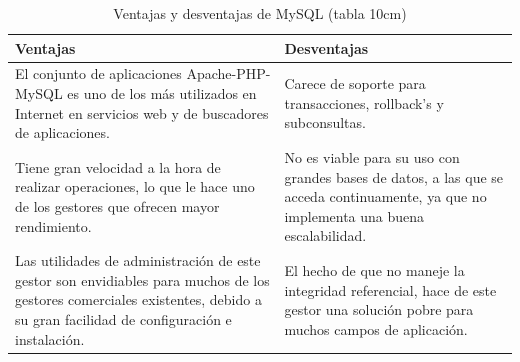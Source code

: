 \documentclass[thesis]{udpbook}
\begin{document}
\begin{table}
\begin{center}
\resizebox{10cm}{!} {

\begin{tabular}{|p{5cm}|p{5cm}|}

\hline

Ventajas & Desventajas \\

\hline

El conjunto de aplicaciones Apache-PHP-MySQL es uno de los más utilizados en Internet en servicios web y de buscadores de aplicaciones. & Carece de soporte para transacciones, rollback's y subconsultas. \\



\hline

Tiene gran velocidad a la hora de realizar operaciones, lo que le hace uno de los gestores que ofrecen mayor rendimiento. & No es viable para su uso con grandes bases de datos, a las que se acceda continuamente, ya que no implementa una buena escalabilidad. \\


\hline

Las utilidades de administración de este gestor son envidiables para muchos de los gestores comerciales existentes, debido a su gran facilidad de configuración e instalación. &  El hecho de que no maneje la integridad referencial, hace de este gestor una solución pobre para muchos campos de aplicación.\\

\hline

\end{tabular}

}

\end{center}

\caption{Ventajas y desventajas de MySQL (tabla 10cm)}

\label{Ventajas y desventajas de MySQL}

\end{table} 
\end{document}
